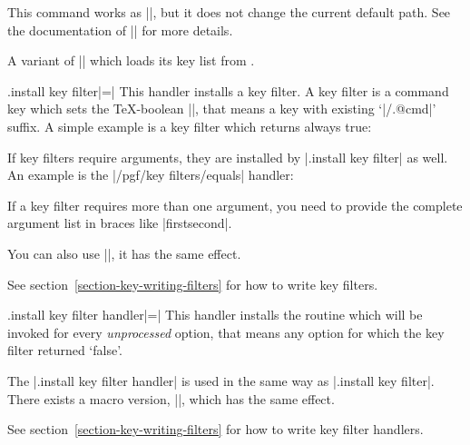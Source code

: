 \begin{command}{\pgfkeysalsofiltered{}}
	This command works as |\pgfkeysfiltered|, but it does not change the current default path. See the documentation of |\pgfkeysalso| for more details.
\end{command}

\begin{command}{\pgfkeysalsofilteredfrom{}}
	A variant of |\pgfkeysalsofiltered| which loads its key list from .
\end{command}

\begin{handler}{{.install key filter}|=|}
	This handler installs a key filter. A key filter is a command key which sets the \TeX-boolean |\ifpgfkeysfiltercontinue|, that means a key with existing `|/.@cmd|' suffix. A simple example is a key filter which returns always true:
\begin{codeexample}
\end{codeexample}
	If key filters require arguments, they are installed by |.install key filter| as well. An example is the |/pgf/key filters/equals| handler:
\begin{codeexample}[]
\end{codeexample}
	If a key filter requires more than one argument, you need to provide the complete argument list in braces like |{{first}{second}}|.

	You can also use |\pgfkeysinstallkeyfilter|, it has the same effect.

	See section~\ref{section-key-writing-filters} for how to write key filters.
\end{handler}

\begin{handler}{{.install key filter handler}|=|}
	This handler installs the routine which will be invoked for every \emph{unprocessed} option, that means any option for which the key filter returned `false'.

	The |.install key filter handler| is used in the same way as |.install key filter|. There exists a macro version, |\pgfkeysinstallkeyfilterhandler|, which has the same effect.

	See section~\ref{section-key-writing-filters} for how to write key filter handlers.
\end{handler}

